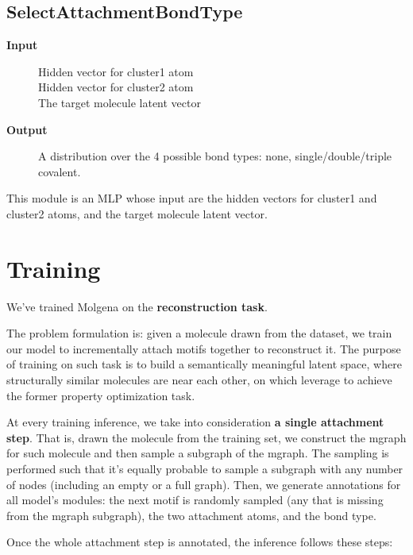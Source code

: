 \documentclass{article}
\begin{document}

\subsection{SelectAttachmentBondType}

\begin{description}
\item[\textbf{Input}]
    Hidden vector for cluster1 atom\\
    Hidden vector for cluster2 atom\\
    The target molecule latent vector
\item[\textbf{Output}]
    A distribution over the 4 possible bond types: none, single/double/triple covalent.
\end{description}

This module is an MLP whose input are the hidden vectors for cluster1 and cluster2 atoms, and the target molecule latent vector.


\section{Training}

We've trained Molgena on the \textbf{reconstruction task}.

The problem formulation is: given a molecule drawn from the dataset, we train our model to incrementally attach motifs together to reconstruct it.
The purpose of training on such task is to build a semantically meaningful latent space, where structurally similar molecules are near each other,
on which leverage to achieve the former property optimization task.

At every training inference, we take into consideration \textbf{a single attachment step}.
That is, drawn the molecule from the training set, we construct the mgraph for such molecule and then sample a subgraph of the mgraph.
The sampling is performed such that it's equally probable to sample a subgraph with any number of nodes (including an empty or a full graph).
Then, we generate annotations for all model's modules:
the next motif is randomly sampled (any that is missing from the mgraph subgraph),
the two attachment atoms, and the bond type.

Once the whole attachment step is annotated, the inference follows these steps:
\end{document}
